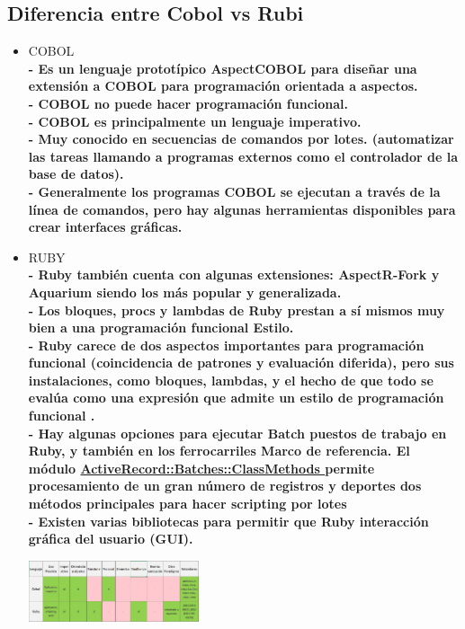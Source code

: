 \documentclass[twoside,twocolumn]{article}
\begin{document}
\subsection{Diferencia entre Cobol vs Rubi}
\begin{itemize}
\item COBOL
\\ \textbf{- Es un lenguaje prototípico AspectCOBOL para diseñar una extensión a COBOL para programación orientada a aspectos.}
\\ \textbf{- COBOL no puede hacer programación funcional.}
\\ \textbf{- COBOL es principalmente un lenguaje imperativo. }
\\ \textbf{- Muy conocido en secuencias de comandos por lotes.  (automatizar las tareas llamando a programas externos
como el controlador de la base de datos).}
\\ \textbf{- Generalmente los programas COBOL se ejecutan a través de la línea de comandos, pero hay algunas herramientas
disponibles para crear interfaces gráficas.}
\item RUBY
\\ \textbf{- Ruby también cuenta con algunas extensiones:
AspectR-Fork y Aquarium siendo los más
popular y generalizada.}
\\ \textbf{- Los bloques, procs y lambdas de Ruby prestan
a sí mismos muy bien a una programación funcional
Estilo.}
\\ \textbf{ - Ruby carece de dos aspectos importantes para
programación funcional (coincidencia de patrones y
evaluación diferida), pero sus instalaciones, como
bloques, lambdas, y el hecho de que todo
se evalúa como una expresión que admite un
estilo de programación funcional
.}
\\ \textbf{-  Hay algunas opciones para ejecutar Batch
puestos de trabajo en Ruby, y también en los ferrocarriles
Marco de referencia. El módulo
{\bf \underline {{} ActiveRecord::Batches::ClassMethods }}
permite procesamiento de un gran número de registros y deportes
dos métodos principales para hacer scripting por lotes}
\\ \textbf{- Existen varias bibliotecas para permitir que Ruby
interacción gráfica del usuario (GUI).
}
\begin{center}
	\includegraphics[width=5cm]{./Imagenes/Diferencias} 
	\end{center}
\end{itemize}
\end{document}
